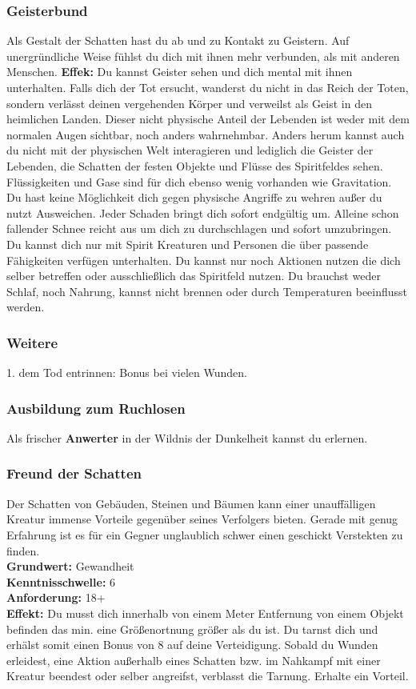 \subsubsection*{Geisterbund} \label{sk:geisterbund}
Als Gestalt der Schatten hast du ab und zu Kontakt zu Geistern. Auf unergründliche Weise fühlst du dich mit ihnen mehr verbunden, als mit anderen Menschen.
\textbf{Effek:} Du kannst Geister sehen und dich mental mit ihnen unterhalten. Falls dich der Tot ersucht, wanderst du nicht in das Reich der Toten, sondern verlässt deinen vergehenden Körper und verweilst als Geist in den heimlichen Landen. Dieser nicht physische Anteil der Lebenden ist weder mit dem normalen Augen sichtbar, noch anders wahrnehmbar. Anders herum kannst auch du nicht mit der physischen Welt interagieren und lediglich die Geister der Lebenden, die Schatten der festen Objekte und Flüsse des Spiritfeldes sehen.  Flüssigkeiten und Gase sind für dich ebenso wenig vorhanden wie Gravitation. Du hast keine Möglichkeit dich gegen physische Angriffe zu wehren außer du nutzt Ausweichen. Jeder Schaden bringt dich sofort endgültig um. Alleine schon fallender Schnee reicht aus um dich zu durchschlagen und sofort umzubringen. Du kannst dich nur mit Spirit Kreaturen und Personen die über passende Fähigkeiten verfügen unterhalten. Du kannst nur noch Aktionen nutzen die dich selber betreffen oder ausschließlich das Spiritfeld nutzen. Du brauchst weder Schlaf, noch Nahrung, kannst nicht brennen oder durch Temperaturen beeinflusst werden.

\subsubsection*{Weitere}
1. dem Tod entrinnen: Bonus bei vielen Wunden.

\subsubsection*{Ausbildung zum Ruchlosen}
Als frischer \textbf{Anwerter} in der Wildnis der Dunkelheit kannst du \textit{} erlernen.\\

\subsubsection*{Freund der Schatten} \label{sk:freundderschatten}
Der Schatten von Gebäuden, Steinen und Bäumen kann einer unauffälligen Kreatur immense Vorteile gegenüber seines Verfolgers bieten. Gerade mit genug Erfahrung ist es für ein Gegner unglaublich schwer einen geschickt Verstekten zu finden.\\
\textbf{Grundwert:} Gewandheit \\
\textbf{Kenntnisschwelle:} 6 \\
\textbf{Anforderung:} 18+\\
\textbf{Effekt:} Du musst dich innerhalb von einem Meter Entfernung von einem Objekt befinden das min. eine Größenortnung größer als du ist. Du tarnst dich und erhälst somit einen Bonus von 8 auf deine Verteidigung. Sobald du Wunden erleidest, eine Aktion außerhalb eines Schatten bzw. im Nahkampf mit einer Kreatur beendest oder selber angreifst, verblasst die Tarnung. Erhalte ein Vorteil.

